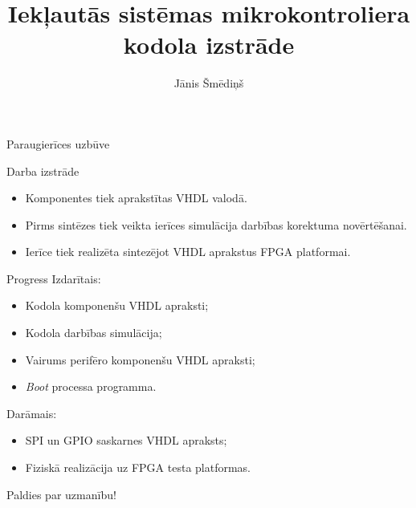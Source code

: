 \documentclass[xetex]{beamer} %
\author{Jānis Šmēdiņš}
\title[Mikrokontroliera kodola izstrāde]
	{Iekļautās sistēmas mikrokontroliera kodola izstrāde}
\newcommand{\termEn}[1]{\textenglish{\itshape {#1}}} %
\begin{document}
	\begin{frame}
		\titlepage 	%
	\end{frame}
	
	\begin{frame}{Paraugierīces uzbūve}
		~ %
		{\def\svgwidth{\textwidth} \small }
	\end{frame}
	
	\begin{frame}{Darba izstrāde}
		\begin{itemize}
			\item Komponentes tiek aprakstītas VHDL valodā.
			\item Pirms sintēzes tiek veikta ierīces simulācija
				darbības korektuma novērtēšanai.
			\item Ierīce tiek realizēta sintezējot VHDL aprakstus
				FPGA platformai.
		\end{itemize}
	\end{frame}
	
	\begin{frame}{Progress}
		\large Izdarītais:
		\begin{itemize}\small
			\item Kodola komponenšu VHDL apraksti;
			\item Kodola darbības simulācija;
			\item Vairums perifēro komponenšu VHDL apraksti;
			\item \termEn{Boot} processa programma.
		\end{itemize}
		\large Darāmais:
		\begin{itemize}\small
			\item SPI un GPIO saskarnes VHDL apraksts;
			\item Fiziskā realizācija uz FPGA testa platformas.
		\end{itemize}
	\end{frame}
	
	\begin{frame}
		\begin{center}
			\Large Paldies par uzmanību!\\[2em]
		\end{center}
	\end{frame}
	
\end{document}
